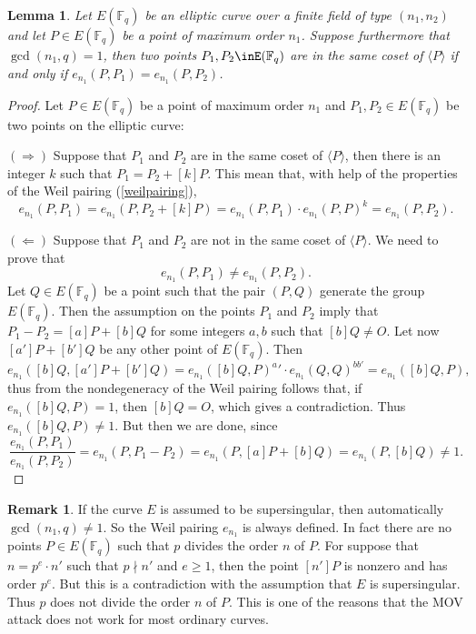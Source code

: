 \documentclass{article}
\numberwithin{equation}{section}
\newtheorem{lemma}[theorem]{Lemma}
\theoremstyle{definition}
\newtheorem{remark}[theorem]{Remark}
\newcommand{\FF}[1]{{\mathbb F}_{#1}} %
\newcommand{\grgen}[1]{\langle #1 \rangle} %
\begin{document}
\begin{lemma}\label{cosetdistinction}
Let $E(\FF{q})$ be an elliptic curve over a finite field of type $(n_1,n_2)$ and let $P \in E(\FF{q})$ be a point of maximum order $n_1$. Suppose furthermore that $\gcd(n_1,q)=1$, then two points $P_1,P_2\inE(\FF{q})$ are in the same coset of $\grgen{P}$ if and only if $e_{n_1}(P,P_1)=e_{n_1}(P,P_2)$.
\end{lemma}

\begin{proof}
Let $P \in E(\FF{q})$ be a point of maximum order $n_1$ and $P_1,P_2 \in E(\FF{q})$ be two points on the elliptic curve: \par
$(\Rightarrow )$ Suppose that $P_1$ and $P_2$ are in the same coset of $\grgen{P}$, then there is an integer $k$ such that $P_1 = P_2+[k]P$. This mean that, with help of the properties of the Weil pairing (\ref{weilpairing}), $$e_{n_1}(P,P_1)=e_{n_1}(P,P_2+[k]P) = e_{n_1}(P,P_1) \cdot e_{n_1}(P,P)^k = e_{n_1}(P,P_2).$$ \par 
$(\Leftarrow)$ Suppose that $P_1$ and $P_2$ are not in the same coset of $\grgen{P}$. We need to prove that $$e_{n_1}(P,P_1) \neq e_{n_1}(P,P_2).$$ Let $Q\in E(\FF{q})$ be a point such that the pair $(P,Q)$ generate the group $E(\FF{q})$. Then the assumption on the points $P_1$ and $P_2$ imply that $P_1-P_2=[a]P+[b]Q$ for some integers $a,b$ such that $[b]Q \neq O$. Let now $[a']P+[b']Q$ be any other point of $E(\FF{q})$. Then $$e_{n_1}([b]Q,[a']P+[b']Q)=e_{n_1}([b]Q,P)^a'\cdot e_{n_1}(Q,Q)^{bb'} = e_{n_1}([b]Q,P),$$ thus from the nondegeneracy of the Weil pairing follows that, if $e_{n_1}([b]Q,P)=1$, then $[b]Q=O$, which gives a contradiction. Thus $e_{n_1}([b]Q,P) \neq 1$. But then we are done, since $$\frac{e_{n_1}(P,P_1)}{e_{n_1}(P,P_2)} = e_{n_1}(P,P_1-P_2) = e_{n_1}(P,[a]P+[b]Q) = e_{n_1}(P,[b]Q) \neq 1.$$
\end{proof}

\begin{remark}\label{reasonforss}
If the curve $E$ is assumed to be supersingular, then automatically $\gcd(n_1,q)\neq1$. So the Weil pairing $e_{n_1}$ is always defined. In fact there are no points $P \in E(\FF{q})$ such that $p$ divides the order $n$ of $P$. For suppose that $n=p^e\cdot n'$ such that $p \nmid n'$ and $e \geq 1$, then the point $[n']P$ is nonzero and has order $p^e$. But this is a contradiction with the assumption that $E$ is supersingular. Thus $p$ does not divide the order $n$ of $P$. This is one of the reasons that the MOV attack does not work for most ordinary curves. 
\end{remark}
\end{document}
